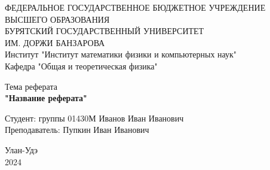 \begin{titlepage}
\begin{center}
    ФЕДЕРАЛЬНОЕ ГОСУДАРСТВЕННОЕ БЮДЖЕТНОЕ УЧРЕЖДЕНИЕ \\
    ВЫСШЕГО ОБРАЗОВАНИЯ \\
    БУРЯТСКИЙ ГОСУДАРСТВЕННЫЙ УНИВЕРСИТЕТ\\
    ИМ. ДОРЖИ БАНЗАРОВА \\
    Институт "Институт математики физики и компьютерных наук" \\
    Кафедра "Общая и теоретическая физика"
\end{center}

\vspace{28em}

\begin{center}
    Тема реферата \\ \textbf{"Название реферата"}
\end{center}

\newbox{\lbox}
\newlength{\maxl}
\setlength{\maxl}{\wd\lbox}
\hfill\parbox{5cm}{
\hspace*{5cm}\hspace*{-5cm}Студент: группы 01430М Иванов Иван Иванович\hfill\\
\hspace*{5cm}\hspace*{-5cm}Преподаватель: Пупкин Иван Иванович\\
}

\vspace{\fill}
\begin{center}
    Улан-Удэ \\2024
\end{center}
\end{titlepage}